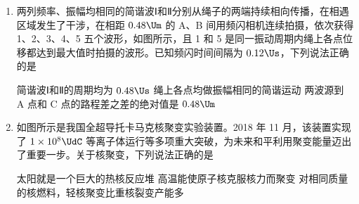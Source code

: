 \documentclass[\gkver]{gaokaozhenti}
\begin{document}
\begin{enumerate}
{故选 B。
}

\item
两列频率、振幅均相同的简谐波Ⅰ和Ⅱ分别从绳子的两端持续相向传播，在相遇区域发生了干涉，在相距 $0.48 \Um$ 的 A、B 间用频闪相机连续拍摄，依次获得 1、2、3、4、5 五个波形，如图所示，且 1 和 5 是同一振动周期内绳上各点位移都达到最大值时拍摄的波形。已知频闪时间间隔为 $0.12 \Us$，下列说法正确的是

\onepicture[w=5.79cm]{}

{简谐波Ⅰ和Ⅱ的周期均为 $0.48 \Us$}
{绳上各点均做振幅相同的简谐运动}
{两波源到 A 点和 C 点的路程差之差的绝对值是 $0.48 \Um$}


\item
如图所示是我国全超导托卡马克核聚变实验装置。2018 年 11 月，该装置实现了 $1 \times 10^{8} \UdC$ 等离子体运行等多项重大突破，为未来和平利用聚变能量迈出了重要一步。关于核聚变，下列说法正确的是


{太阳就是一个巨大的热核反应堆}
{高温能使原子核克服核力而聚变}
{对相同质量的核燃料，轻核聚变比重核裂变产能多}

\end{enumerate}
\end{document}
